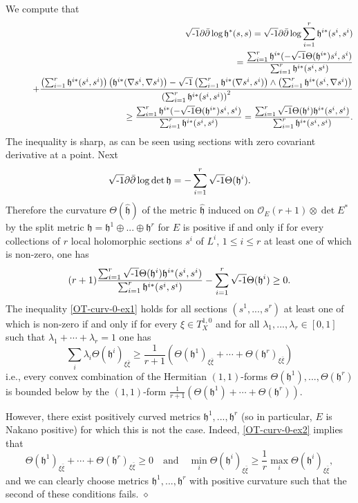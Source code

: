 \documentclass[12pt,hidelinks]{amsart}
\newcommand{\cO}{{\mathcal O}}
\newcommand{\fh}{{\mathfrak h}}
\newcommand{\red}{\hfill $\diamond$}
\newcommand{\di}{\partial}
\newcommand{\dbar}{\bar \partial}
\newcommand{\ii}{\sqrt{\text{\rm -}1}}
\newcommand{\tensor}{\otimes}
\begin{document}
\begin{ex}
We compute that
\begin{eqnarray*}
&& \ii \di\dbar \log \fh^* (s,s) = \ii \di \dbar \log \sum _{i=1} ^r \fh^{i*} (s^i,s^i) \\
&& \quad = \frac{\sum _{i=1} ^r \fh^{i*} (-\ii \Theta (\fh^{i*})s^i,s^i)}{\sum _{i=1} ^r \fh^{i*} (s^i,s^i)}  \\
&& \quad \quad +\frac{\left ( \sum _{i=1} ^r \fh^{i*} (s^i,s^i) \right ) \left (\fh^{i*} (\nabla s^i, \nabla s^i) \right ) - \ii \left (\sum _{i=1} ^r \fh^{i*} (\nabla s^i,s^i)\right ) \wedge \left (\sum _{i=1} ^r \fh^{i*} (s^i,\nabla s^i) \right )}{\left (\sum _{i=1} ^r \fh^{i*} (s^i,s^i)\right )^2}\\
&& \quad \ge \frac{\sum _{i=1} ^r \fh^{i*} (-\ii \Theta (\fh^{i*})s^i,s^i)}{\sum _{i=1} ^r \fh^{i*} (s^i,s^i)} = \frac{\sum _{i=1} ^r \ii \Theta (\fh^i) \fh^{i*} (s^i,s^i)}{\sum _{i=1} ^r \fh^{i*} (s^i,s^i)}.
\end{eqnarray*}
The inequality is sharp, as can be seen using sections with zero covariant derivative at a point.  Next 
\[
\ii \di \dbar \log \det \fh = - \sum _{i=1} ^r \ii \Theta (\fh^i).
\]
Therefore the curvature $\Theta(\hat \fh)$ of the metric $\hat \fh$ induced on $\cO _E(r+1) \tensor \det E^*$ by the split metric $\fh = \fh^1 \oplus ... \oplus \fh ^r$ for $E$ is positive if and only if for every collections of $r$ local holomorphic sections $s^i$ of $L^i$, $1 \le i \le r$ at least one of which is non-zero, one has 
\begin{equation}\label{OT-curv-0-ex1}
(r+1) \frac{\sum _{i=1} ^r \ii \Theta (\fh^i) \fh^{i*} (s^i,s^i)}{\sum _{i=1} ^r \fh^{i*} (s^i,s^i)} - \sum _{i=1} ^r \ii \Theta (\fh^i) \ge 0.
\end{equation}
The inequality \eqref{OT-curv-0-ex1} holds for all sections $(s^1,...,s^r)$ at least one of which is non-zero if and only if for every $\xi \in T^{1,0}_{X}$ and for all $\lambda _1,..., \lambda _r \in [0,1]$ such that $\lambda _1 +\cdots + \lambda _r = 1$ one has 
\begin{equation}\label{OT-curv-0-ex2}
\sum_i \lambda _i \Theta (\fh^i)_{\xi \bar \xi} \ge \frac{1}{r+1} \left (\Theta (\fh^1)_{\xi \bar \xi}+ \cdots + \Theta (\fh^r)_{\xi\bar \xi}\right )
\end{equation}
i.e., every convex combination of the Hermitian $(1,1)$-forms $\Theta (\fh^1), ... ,\Theta (\fh^r)$ is bounded below by the $(1,1)$-form $\frac{1}{r+1} \left (\Theta (\fh^1)+ \cdots + \Theta (\fh^r)\right )$.

However, there exist positively curved metrics $\fh ^1,...,\fh^r$ (so in particular, $E$ is Nakano positive) for which this is not the case.  Indeed, \eqref{OT-curv-0-ex2} implies that 
\begin{equation}\label{outcome-ex1}
\Theta (\fh^1)_{\xi \bar \xi}+ \cdots + \Theta (\fh^r)_{\xi \bar \xi} \ge 0 \quad \text{and} \quad \min _i  \Theta (\fh^i)_{\xi \bar \xi} \ge  \frac{1}{r} \max _i \Theta (\fh ^i)_{\xi \bar \xi},
\end{equation}
and we can clearly choose metrics $\fh^1,..., \fh ^r$ with positive curvature such that the second of these conditions fails.
\red
\end{ex}
\end{document}
